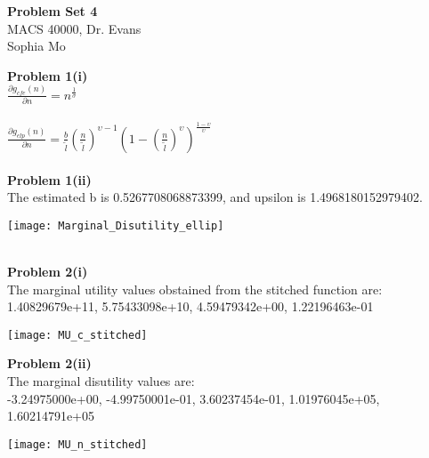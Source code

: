 \documentclass[letterpaper,12pt]{article}
\theoremstyle{definition}
\begin{document}
\begin{flushleft}
  \textbf{\large{Problem Set 4}} \\
  MACS 40000, Dr. Evans \\
  Sophia Mo
\end{flushleft}

\vspace{5mm}

\noindent\textbf{Problem 1(i)}\\
$\frac{\partial g_{cfe}(n)}{\partial n} = n^{\frac{1}{\sigma}}$\\
\\
$\frac{\partial g_{elp}(n)}{\partial n} = \frac{b}{\tilde{l}}(\frac{n}{\tilde{l}})^{\upsilon - 1}(1 - (\frac{n}{\tilde{l}})^\upsilon)^{\frac{1-\upsilon}{\upsilon}}$\\
\\
\noindent\textbf{Problem 1(ii)}\\
The estimated b is 0.5267708068873399, and upsilon is 1.4968180152979402.\\
\begin{center}
\texttt{[image: Marginal\_Disutility\_ellip]}
\end{center}
\\
\noindent\textbf{Problem 2(i)}\\
The marginal utility values obstained from the stitched function are:\\
1.40829679e+11,   5.75433098e+10,   4.59479342e+00,   1.22196463e-01\\
\begin{center}
\texttt{[image: MU\_c\_stitched]}
\end{center}
\noindent\textbf{Problem 2(ii)}\\
The marginal disutility values are:\\
-3.24975000e+00,  -4.99750001e-01,   3.60237454e-01,   1.01976045e+05,
   1.60214791e+05\\
\begin{center}
\texttt{[image: MU\_n\_stitched]}
\end{center}
\end{document}
